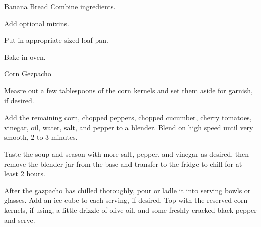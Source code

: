 \documentclass[letterpaper]{book}
\begin{document}
\begin{recipe}{Banana Bread}{}{}
    Combine ingredients.

    Add optional mixins.

    \newstep
    Put in appropriate sized loaf pan.

    \newstep
    Bake in oven.
\end{recipe}

\begin{recipe}{Corn Gezpacho}{}{}

    Measre out a few tablespoons of the corn kernels and set them aside for garnish, if desired.


    Add the remaining corn, chopped peppers, chopped cucumber, cherry tomatoes, vinegar, oil, water, salt, and pepper to a blender.
    Blend on high speed until very smooth, 2 to 3 minutes.

    \newstep

    Taste the soup and season with more salt, pepper, and vinegar as desired, then remove the blender jar from the base and transfer to the fridge to chill for at least 2 hours.


    After the gazpacho has chilled thoroughly, pour or ladle it into serving bowls or glasses. Add an ice cube to each serving, if desired.
    Top with the reserved corn kernels, if using, a little drizzle of olive oil, and some freshly cracked black pepper and serve.

\end{recipe}
\end{document}
